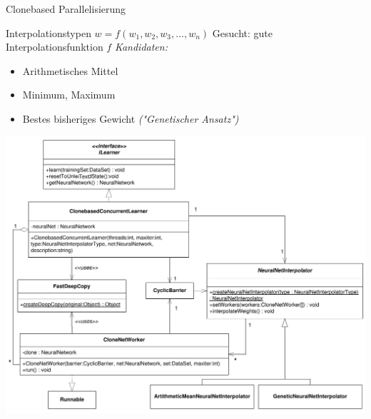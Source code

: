 \documentclass[18pt]{beamer}
\begin{document}
\begin{frame}[allowframebreaks]{Clonebased Parallelisierung}
	\framebreak
		\begin{block}{Interpolationstypen}
			$w = f(w_1,w_2,w_3,...,w_n)$
			\newline
			Gesucht: gute Interpolationsfunktion $f$
			\newline
			\newline
			\emph{Kandidaten:}
			\begin{itemize}
				\item Arithmetisches Mittel
				\item Minimum, Maximum
				\item Bestes bisheriges Gewicht \emph{("Genetischer Ansatz")}
			\end{itemize}
		\end{block}
		
	\framebreak
		\includegraphics[height=0.8\textheight]{Grafiken/Clonebased_classdiagram}
		

\end{frame}
\end{document}
